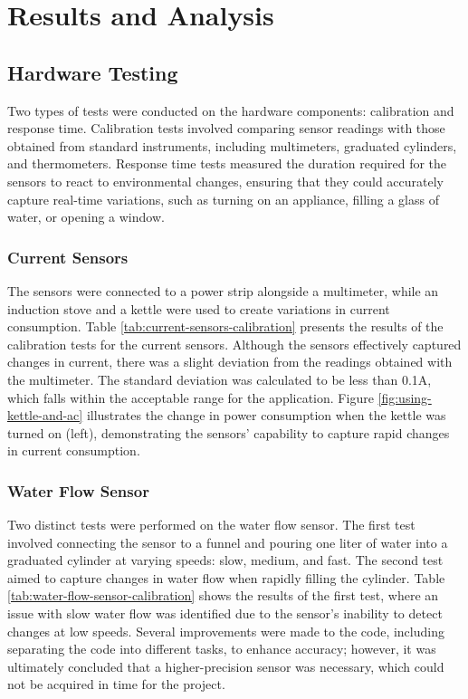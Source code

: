 \section{Results and Analysis}

\subsection{Hardware Testing}

Two types of tests were conducted on the hardware components: calibration and response time. Calibration tests involved 
comparing sensor readings with those obtained from standard instruments, including multimeters, graduated cylinders, and
thermometers. Response time tests measured the duration required for the sensors to react to environmental changes, 
ensuring that they could accurately capture real-time variations, such as turning on an appliance, filling a glass of 
water, or opening a window.

\subsubsection{Current Sensors}

The sensors were connected to a power strip alongside a multimeter, while an induction stove and a kettle were used to 
create variations in current consumption. Table \ref{tab:current-sensors-calibration} presents the results of the 
calibration tests for the current sensors. Although the sensors effectively captured changes in current, there was a 
slight deviation from the readings obtained with the multimeter. The standard deviation was calculated to be less than 
0.1A, which falls within the acceptable range for the application. Figure \ref{fig:using-kettle-and-ac} illustrates the 
change in power consumption when the kettle was turned on (left), demonstrating the sensors' capability to capture rapid 
changes in current consumption.

\subsubsection{Water Flow Sensor}

Two distinct tests were performed on the water flow sensor. The first test involved connecting the sensor to a funnel 
and pouring one liter of water into a graduated cylinder at varying speeds: slow, medium, and fast. The second test 
aimed to capture changes in water flow when rapidly filling the cylinder. Table \ref{tab:water-flow-sensor-calibration}
shows the results of the first test, where an issue with slow water flow was identified due to the sensor's inability to 
detect changes at low speeds. Several improvements were made to the code, including separating the code into different 
tasks, to enhance accuracy; however, it was ultimately concluded that a higher-precision sensor was necessary, which 
could not be acquired in time for the project.

